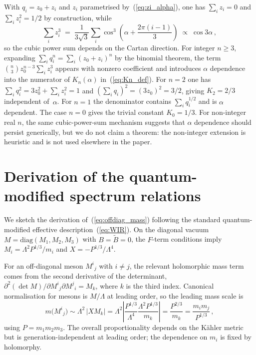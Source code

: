 \documentclass[11pt,a4paper]{article}
\newcommand{\diag}{\mathrm{diag}}
\begin{document}
With $q_i=z_0+z_i$ and $z_i$ parametrised by~(\ref{eq:zi_alpha}),
one has $\sum_i z_i=0$ and $\sum_i z_i^2=1/2$ by construction, while
\begin{equation}
  \sum_i z_i^3 \;=\; \frac{1}{3\sqrt3}\sum_i \cos^3\!\left(\alpha+\frac{2\pi(i-1)}{3}\right)
  \;\propto\; \cos 3\alpha\,,
  \label{eq:sumz3}
\end{equation}
so the cubic power sum depends on the Cartan direction.
For integer $n\ge3$, expanding $\sum_i q_i^n=\sum_i(z_0+z_i)^n$ by the
binomial theorem, the term $\binom{n}{3}z_0^{n-3}\sum_i z_i^3$ appears with
nonzero coefficient and introduces $\alpha$ dependence into the numerator of
$K_n(\alpha)$ in~(\ref{eq:Kn_def}).  For $n=2$ one has $\sum_i q_i^2=3z_0^2+\sum_i z_i^2=1$
and $(\sum_i q_i)^2=(3z_0)^2=3/2$, giving $K_2=2/3$ independent of~$\alpha$.
For $n=1$ the denominator contains $\sum_i q_i^{1/2}$ and is $\alpha$ dependent.
The case $n=0$ gives the trivial constant $K_0=1/3$.
For non-integer real $n$, the same cubic-power-sum mechanism suggests that
$\alpha$ dependence should persist generically, but we do not claim a theorem:
the non-integer extension is heuristic and is not used elsewhere in the paper.

\section{Derivation of the quantum-modified spectrum relations}
\label{app:seiberg_spectrum}

We sketch the derivation of~(\ref{eq:offdiag_mass}) following the standard
quantum-modified effective description~(\ref{eq:WIR}).
On the diagonal vacuum $M=\diag(M_1,M_2,M_3)$ with $B=\tilde B=0$, the $F$-term
conditions imply $M_i=\Lambda^2 P^{1/3}/m_i$ and $X=-P^{1/3}/\Lambda^4$.

For an off-diagonal meson $M^i{}_j$ with $i\neq j$, the relevant holomorphic
mass term comes from the second derivative of the determinant,
$\partial^2(\det M)/\partial M^i{}_j \partial M^j{}_i = M_k$, where $k$ is the
third index.  Canonical normalisation for mesons is $M/\Lambda$ at leading order,
so the leading mass scale is
\begin{equation}
  m\bigl(M^i{}_j\bigr)
  \sim \Lambda^2\,|X M_k|
  = \Lambda^2\left|\frac{P^{1/3}}{\Lambda^4}\frac{\Lambda^2 P^{1/3}}{m_k}\right|
  = \frac{P^{2/3}}{m_k}
  = \frac{m_i m_j}{P^{1/3}}\,,
\end{equation}
using $P=m_1m_2m_3$.  The overall proportionality depends on the K\"ahler metric
but is generation-independent at leading order; the dependence on $m_i$ is fixed
by holomorphy.
\end{document}
